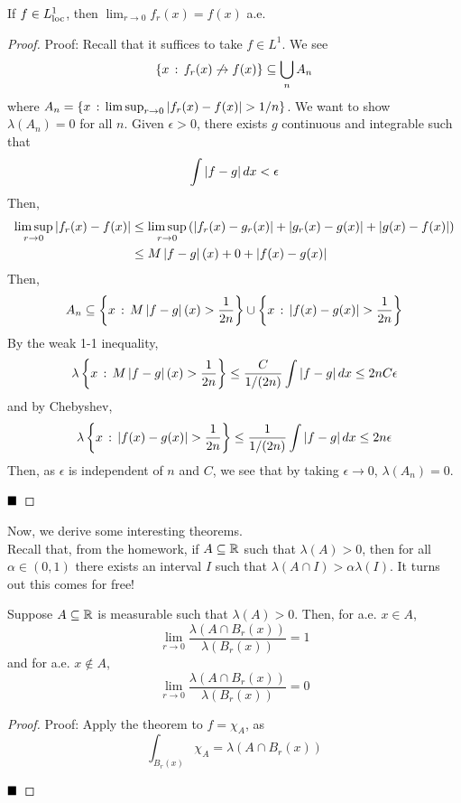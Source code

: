 
\begin{theorem}
    If $f \in L^1_{\tt{loc}}$, then $\lim_{r \to 0} f_r(x) = f(x)$ a.e.
\end{theorem}
\begin{proof}{Proof:}
    Recall that it suffices to take $f \in L^1$. We see
    \[ \{x \col f_r(x) \not\to f(x)\} \subseteq \bigcup_{n} A_n \]
    where $A_n = \{x \col \limsup_{r \to 0} \abs{f_r(x) - f(x)} > 1/n\}$. We want to show $\lambda(A_n) = 0$ for all $n$. Given $\epsilon > 0$, there exists $g$ continuous and integrable such that
    \[ \int \abs{f - g} dx < \epsilon \]
    Then,
    \begin{align*}
        \limsup_{r \to 0} \abs{f_r(x) - f(x)} &\leq \limsup_{r \to 0} \left(\abs{f_r(x) - g_r(x)} + \abs{g_r(x) - g(x)} + \abs{g(x) - f(x)}\right)\\
        &\leq M\abs{f - g}(x) + 0 + \abs{f(x) - g(x)}
    \end{align*}
    Then,
    \[ A_n \subseteq \left\{x \col M\abs{f - g}(x) > \frac{1}{2n}\right\} \cup \left\{x \col \abs{f(x) - g(x)} > \frac{1}{2n}\right\} \]
    By the weak 1-1 inequality,
    \[ \lambda\left\{x \col M\abs{f - g}(x) > \frac{1}{2n}\right\} \leq \frac{C}{1/(2n)}\int \abs{f - g} dx \leq 2nC\epsilon \]
    and by Chebyshev,
    \[ \lambda\left\{x \col \abs{f(x) - g(x)} > \frac{1}{2n}\right\} \leq \frac{1}{1/(2n)}\int \abs{f - g} dx \leq 2n\epsilon \]
    Then, as $\epsilon$ is independent of $n$ and $C$, we see that by taking $\epsilon \to 0$, $\lambda(A_n) = 0$.

    $\qed$
\end{proof}

Now, we derive some interesting theorems.\\

Recall that, from the homework, if $A \subseteq \R$ such that $\lambda(A) > 0$, then for all $\alpha \in (0, 1)$ there exists an interval $I$ such that $\lambda(A \cap I) > \alpha\lambda(I)$. It turns out this comes for free!

\begin{lemma}
    Suppose $A \subseteq \R$ is measurable such that $\lambda(A) > 0$. Then, for a.e. $x \in A$,
    \[ \lim_{r \to 0} \frac{\lambda(A \cap B_r(x))}{\lambda(B_r(x))} = 1 \]
    and for a.e. $x \notin A$,
    \[ \lim_{r \to 0} \frac{\lambda(A \cap B_r(x))}{\lambda(B_r(x))} = 0 \]
\end{lemma}
\begin{proof}{Proof:}
    Apply the theorem to $f = \chi_A$, as
    \[ \int_{B_r(x)} \chi_A = \lambda(A \cap B_r(x)) \]

    $\qed$
\end{proof}

